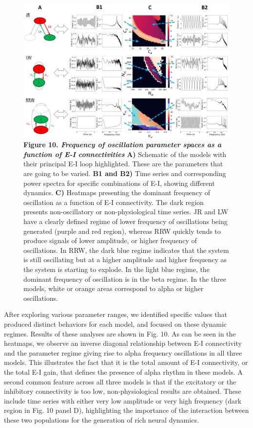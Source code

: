 \documentclass[12pt,twoside]{article}
\begin{document}
\begin{figure}[H]
    \centering
    \includegraphics[width=\linewidth]{Images/Connectivity_5.png}
    \caption*{\textbf{Figure 10.  \textit{Frequency of oscillation parameter spaces as a function of E-I connectivities}} \textbf{A)} Schematic of the models with their principal E-I loop highlighted. These are the parameters that are going to be varied. \textbf{B1 and B2)} Time series and corresponding power spectra for specific combinations of E-I, showing different dynamics. \textbf{C)} Heatmaps presenting the dominant frequency of oscillation as a function of E-I connectivity. The dark region presents non-oscillatory or non-physiological time series. JR and LW have a clearly defined regime of lower frequency of oscillations being generated (purple and red region), whereas RRW quickly tends to produce signals of lower amplitude, or higher frequency of oscillations. In RRW, the dark blue regime indicates that the system is still oscillating but at a higher amplitude and higher frequency as the system is starting to explode. In the light blue regime, the dominant frequency of oscillation is in the beta regime. In the three models, white or orange areas correspond to alpha or higher oscillations.} \label{fig:All_EI_Together}
\end{figure}
\vspace{-\baselineskip} 

After exploring various parameter ranges, we identified specific values that produced distinct behaviors for each model, and focused on these dynamic regimes. Results of these analyses are shown in Fig. 10. As can be seen in the heatmaps, we observe an inverse diagonal relationship between E-I connectivity and the parameter regime giving rise to alpha frequency oscillations in all three models. This illustrates the fact that it is the total amount of E-I connectivity, or the total E-I gain, that defines the presence of alpha rhythm in these models. A second common feature across all three models is that if the excitatory or the inhibitory connectivity is too low, non-physiological results are obtained. These include time series with either very low amplitude or very high frequency (dark region in Fig. 10 panel D), highlighting the importance of the interaction between these two populations for the generation of rich neural dynamics. 
\end{document}

